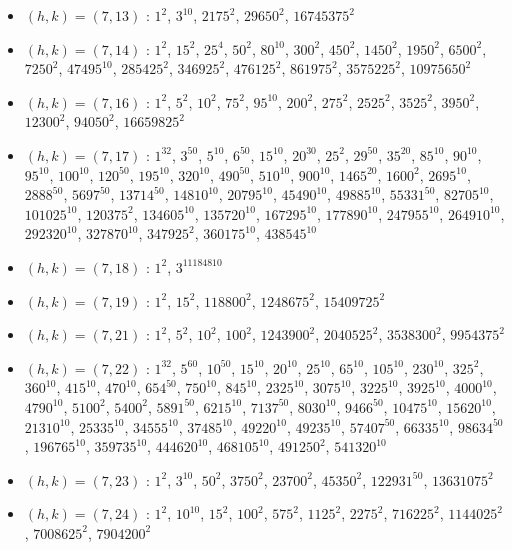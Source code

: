\begin{itemize}
\item $(h,k)=(7,13)$ : $1^{2}$, $3^{10}$, $2175^{2}$, $29650^{2}$, $16745375^{2}$
\item $(h,k)=(7,14)$ : $1^{2}$, $15^{2}$, $25^{4}$, $50^{2}$, $80^{10}$, $300^{2}$, $450^{2}$, $1450^{2}$, $1950^{2}$, $6500^{2}$, $7250^{2}$, $47495^{10}$, $285425^{2}$, $346925^{2}$, $476125^{2}$, $861975^{2}$, $3575225^{2}$, $10975650^{2}$
\item $(h,k)=(7,16)$ : $1^{2}$, $5^{2}$, $10^{2}$, $75^{2}$, $95^{10}$, $200^{2}$, $275^{2}$, $2525^{2}$, $3525^{2}$, $3950^{2}$, $12300^{2}$, $94050^{2}$, $16659825^{2}$
\item $(h,k)=(7,17)$ : $1^{32}$, $3^{50}$, $5^{10}$, $6^{50}$, $15^{10}$, $20^{30}$, $25^{2}$, $29^{50}$, $35^{20}$, $85^{10}$, $90^{10}$, $95^{10}$, $100^{10}$, $120^{50}$, $195^{10}$, $320^{10}$, $490^{50}$, $510^{10}$, $900^{10}$, $1465^{20}$, $1600^{2}$, $2695^{10}$, $2888^{50}$, $5697^{50}$, $13714^{50}$, $14810^{10}$, $20795^{10}$, $45490^{10}$, $49885^{10}$, $55331^{50}$, $82705^{10}$, $101025^{10}$, $120375^{2}$, $134605^{10}$, $135720^{10}$, $167295^{10}$, $177890^{10}$, $247955^{10}$, $264910^{10}$, $292320^{10}$, $327870^{10}$, $347925^{2}$, $360175^{10}$, $438545^{10}$
\item $(h,k)=(7,18)$ : $1^{2}$, $3^{11184810}$
\item $(h,k)=(7,19)$ : $1^{2}$, $15^{2}$, $118800^{2}$, $1248675^{2}$, $15409725^{2}$
\item $(h,k)=(7,21)$ : $1^{2}$, $5^{2}$, $10^{2}$, $100^{2}$, $1243900^{2}$, $2040525^{2}$, $3538300^{2}$, $9954375^{2}$
\item $(h,k)=(7,22)$ : $1^{32}$, $5^{60}$, $10^{50}$, $15^{10}$, $20^{10}$, $25^{10}$, $65^{10}$, $105^{10}$, $230^{10}$, $325^{2}$, $360^{10}$, $415^{10}$, $470^{10}$, $654^{50}$, $750^{10}$, $845^{10}$, $2325^{10}$, $3075^{10}$, $3225^{10}$, $3925^{10}$, $4000^{10}$, $4790^{10}$, $5100^{2}$, $5400^{2}$, $5891^{50}$, $6215^{10}$, $7137^{50}$, $8030^{10}$, $9466^{50}$, $10475^{10}$, $15620^{10}$, $21310^{10}$, $25335^{10}$, $34555^{10}$, $37485^{10}$, $49220^{10}$, $49235^{10}$, $57407^{50}$, $66335^{10}$, $98634^{50}$, $196765^{10}$, $359735^{10}$, $444620^{10}$, $468105^{10}$, $491250^{2}$, $541320^{10}$
\item $(h,k)=(7,23)$ : $1^{2}$, $3^{10}$, $50^{2}$, $3750^{2}$, $23700^{2}$, $45350^{2}$, $122931^{50}$, $13631075^{2}$
\item $(h,k)=(7,24)$ : $1^{2}$, $10^{10}$, $15^{2}$, $100^{2}$, $575^{2}$, $1125^{2}$, $2275^{2}$, $716225^{2}$, $1144025^{2}$, $7008625^{2}$, $7904200^{2}$

\end{itemize}
